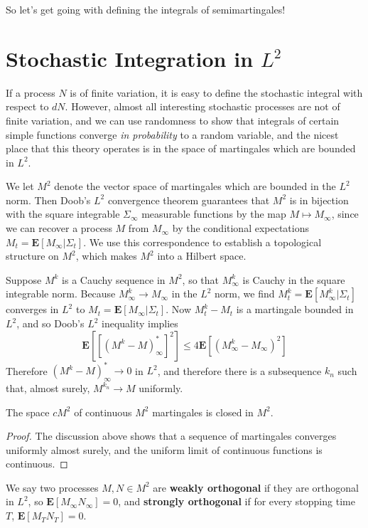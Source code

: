 So let's get going with defining the integrals of semimartingales!

\section{Stochastic Integration in $L^2$}

If a process $N$ is of finite variation, it is easy to define the stochastic integral with respect to $dN$. However, almost all interesting stochastic processes are not of finite variation, and we can use randomness to show that integrals of certain simple functions converge {\it in probability} to a random variable, and the nicest place that this theory operates is in the space of martingales which are bounded in $L^2$.

We let $M^2$ denote the vector space of martingales which are bounded in the $L^2$ norm. Then Doob's $L^2$ convergence theorem guarantees that $M^2$ is in bijection with the square integrable $\Sigma_\infty$ measurable functions by the map $M \mapsto M_\infty$, since we can recover a process $M$ from $M_\infty$ by the conditional expectations $M_t = \mathbf{E}[M_\infty|\Sigma_t]$. We use this correspondence to establish a topological structure on $M^2$, which makes $M^2$ into a Hilbert space.

Suppose $M^k$ is a Cauchy sequence in $M^2$, so that $M^k_\infty$ is Cauchy in the square integrable norm. Because $M^k_\infty \to M_\infty$ in the $L^2$ norm, we find $M^k_t = \mathbf{E}[M^k_\infty|\Sigma_t]$ converges in $L^2$ to $M_t = \mathbf{E}[M_\infty|\Sigma_t]$. Now $M^k_t - M_t$ is a martingale bounded in $L^2$, and so Doob's $L^2$ inequality implies
%
\[ \mathbf{E}[[(M^k - M)^*_\infty]^2] \leq 4 \mathbf{E}[(M^k_\infty - M_\infty)^2] \]
%
Therefore $(M^k - M)^*_\infty \to 0$ in $L^2$, and therefore there is a subsequence $k_n$ such that, almost surely, $M^{k_n} \to M$ uniformly.

\begin{lemma}
    The space $cM^2$ of continuous $M^2$ martingales is closed in $M^2$.
\end{lemma}
\begin{proof}
    The discussion above shows that a sequence of martingales converges uniformly almost surely, and the uniform limit of continuous functions is continuous.
\end{proof}

We say two processes $M,N \in M^2$ are {\bf weakly orthogonal} if they are orthogonal in $L^2$, so $\mathbf{E}[M_\infty N_\infty] = 0$, and {\bf strongly orthogonal} if for every stopping time $T$, $\mathbf{E}[M_T N_T] = 0$.

